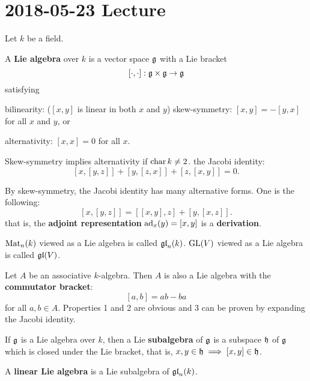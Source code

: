 \section{2018-05-23 Lecture}

Let $k$ be a field.

\begin{defn}
  A \textbf{Lie algebra} over $k$ is a vector space $\mathfrak{g}$ with a Lie bracket
  \[ [\cdot,\cdot]: \mathfrak{g} \times \mathfrak{g} \to \mathfrak{g} \]
  satisfying
  \begin{enum}
    \io bilinearity: ($[x,y]$ is linear in both $x$ and $y$)
    \io skew-symmetry: $[x,y]=-[y,x]$ for all $x$ and $y$, or
    \begin{enum}
      \io alternativity: $[x,x]=0$ for all $x$.
    \end{enum}
    Skew-symmetry implies alternativity if $\operatorname{char} k \neq 2$.
    \io the Jacobi identity:
    \[ [x,[y,z]] + [y,[z,x]] + [z,[x,y]]=0. \]
  \end{enum}
\end{defn}

\begin{rmk}
  By skew-symmetry, the Jacobi identity has many alternative forms.
  One is the following:
  \[ [x,[y,z]] = [[x,y],z] + [y,[x,z]]. \]
  that is, the \textbf{adjoint representation} $\operatorname{ad}_x(y) = [x,y]$ is a \textbf{derivation}.
\end{rmk}

\begin{rmk}
  $\operatorname{Mat}_n(k)$ viewed as a Lie algebra is called $\operatorname{\mathfrak{gl}}_n(k)$.
  $\operatorname{GL}(V)$ viewed as a Lie algebra is called $\operatorname{\mathfrak{gl}}(V)$.
\end{rmk}

\begin{exam}
  Let $A$ be an associative $k$-algebra.
  Then $A$ is also a Lie algebra with the \textbf{commutator bracket}:
  \[ [a,b]=ab-ba \]
  for all $a,b \in A$.
  Properties 1 and 2 are obvious and 3 can be proven by expanding the Jacobi identity.
\end{exam}

\begin{defn}
  If $\mathfrak{g}$ is a Lie algebra over $k$, then a Lie \textbf{subalgebra} of $\mathfrak{g}$ is a subspace $\mathfrak{h}$ of $\mathfrak{g}$ which is closed under the Lie bracket, that is, $x,y \in \mathfrak{h} \implies [x,y] \in \mathfrak{h}$.
\end{defn}

\begin{defn}
  A \textbf{linear Lie algebra} is a Lie subalgebra of $\operatorname{\mathfrak{gl}}_n(k)$.
\end{defn}

